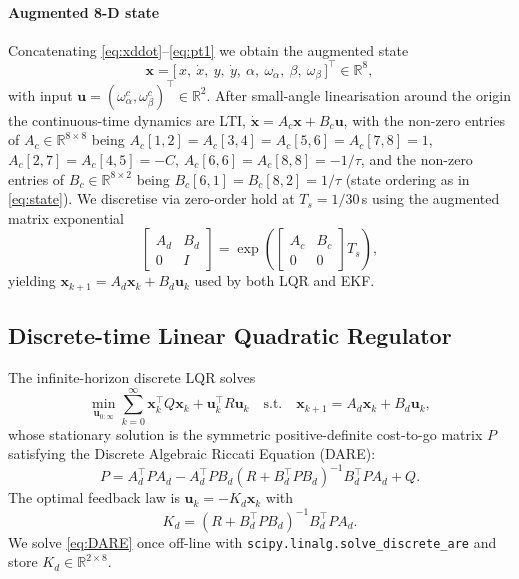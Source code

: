 \documentclass[conference]{IEEEtran}
\newcommand{\R}{\mathbb{R}}
\begin{document}
\paragraph*{Augmented 8-D state}
Concatenating \eqref{eq:xddot}--\eqref{eq:pt1} we obtain the augmented state
\begin{equation}
\bm{x} = \big[\,x,\ \dot{x},\ y,\ \dot{y},\ \alpha,\ \omega_\alpha,\ \beta,\ \omega_\beta\,\big]^\top \in \R^8,
\label{eq:state}
\end{equation}
with input $\bm{u} = (\omega^c_\alpha, \omega^c_\beta)^\top \in \R^2$.
After small-angle linearisation around the origin the continuous-time
dynamics are LTI, $\dot{\bm{x}} = A_c\bm{x} + B_c\bm{u}$, with the
non-zero entries of $A_c\in\R^{8\times 8}$ being
$A_c[1,2]=A_c[3,4]=A_c[5,6]=A_c[7,8]=1$,
$A_c[2,7]=A_c[4,5]=-C$,
$A_c[6,6]=A_c[8,8]=-1/\tau$, and the non-zero entries of $B_c\in\R^{8\times 2}$
being $B_c[6,1]=B_c[8,2]=1/\tau$ (state ordering as in
\eqref{eq:state}).
We discretise via zero-order hold at $T_s = 1/30\,$s using the
augmented matrix exponential \cite{vanLoan1978}
\begin{equation}
\begin{bmatrix} A_d & B_d \\ 0 & I \end{bmatrix} = \exp\!\left(\begin{bmatrix} A_c & B_c \\ 0 & 0 \end{bmatrix} T_s\right),
\label{eq:zoh}
\end{equation}
yielding $\bm{x}_{k+1} = A_d\bm{x}_k + B_d\bm{u}_k$ used by both LQR and
EKF.

\subsection{Discrete-time Linear Quadratic Regulator}
\label{sec:lqr}
The infinite-horizon discrete LQR solves
\begin{equation}
\min_{\bm{u}_{0:\infty}}\sum_{k=0}^{\infty}\bm{x}_k^\top Q \bm{x}_k + \bm{u}_k^\top R \bm{u}_k
\quad \text{s.t.}\quad \bm{x}_{k+1}=A_d\bm{x}_k + B_d\bm{u}_k,
\label{eq:lqr_cost}
\end{equation}
whose stationary solution is the symmetric positive-definite cost-to-go
matrix $P$ satisfying the Discrete Algebraic Riccati Equation (DARE):
\begin{equation}
P = A_d^\top P A_d - A_d^\top P B_d (R + B_d^\top P B_d)^{-1} B_d^\top P A_d + Q.
\label{eq:DARE}
\end{equation}
The optimal feedback law is $\bm{u}_k = -K_d \bm{x}_k$ with
\begin{equation}
K_d = (R + B_d^\top P B_d)^{-1} B_d^\top P A_d.
\label{eq:Kd}
\end{equation}
We solve \eqref{eq:DARE} once off-line with \texttt{scipy.linalg.solve\_discrete\_are}
and store $K_d \in \R^{2\times 8}$.
\end{document}

